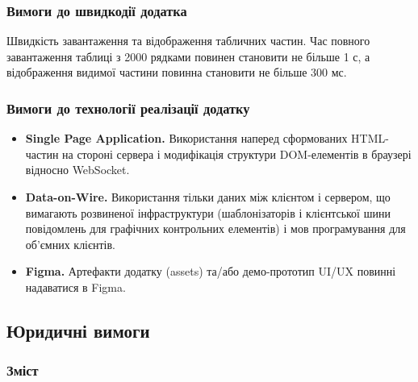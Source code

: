 \documentclass{article}
\begin{document}
\newpage
\subsubsection{Вимоги до швидкодії додатка}

Швидкість завантаження та відображення табличних частин.
Час повного завантаження таблиці з 2000 рядками повинен становити не більше 1 с,
а відображення видимої частини повинна становити не більше 300 мс.

\subsubsection{Вимоги до технології реалізації додатку}

\begin{itemize}
    \item \textbf{Single Page Application.} Використання наперед сформованих HTML-частин на стороні сервера і модифікація структури DOM-елементів в браузері відносно WebSocket.
    \item \textbf{Data-on-Wire.} Використання тільки даних між клієнтом і сервером, що вимагають розвиненої інфраструктури (шаблонізаторів і клієнтської шини повідомлень для графічних контрольних елементів) і мов програмування для об'ємних клієнтів.
    \item \textbf{Figma.} Артефакти додатку (assets) та/або демо-прототип UI/UX повинні надаватися в Figma.
\end{itemize}

\newpage
\subsection{Юридичні вимоги}

\subsubsection{Зміст}
\end{document}
